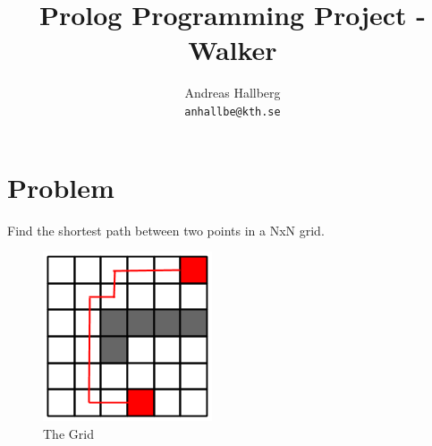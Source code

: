 \documentclass[]{article}
\title{Prolog Programming Project - Walker}
\author{Andreas Hallberg \\ \texttt{anhallbe@kth.se}}
\begin{document}
\maketitle

\section{Problem}
Find the shortest path between two points in a NxN grid.
\begin{figure}
\centering
	\includegraphics[scale=0.8]{prolog_grid}
	\caption{The Grid}
	\label{grid}
\end{figure}
\end{document}
